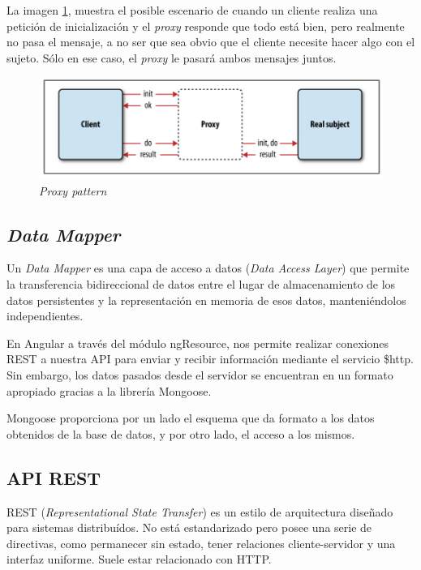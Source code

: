 La imagen \ref{fig:proxy}, muestra el posible escenario de cuando un cliente realiza una petición de inicialización y el \textit{proxy} responde que todo está bien, pero realmente no pasa el mensaje, a no ser que sea obvio que el cliente necesite hacer algo con el sujeto. Sólo en ese caso, el \textit{proxy} le pasará ambos mensajes juntos\cite{stoyanstefanov2010}.
 

\begin{figure}[htbp] 
    \centering
    \includegraphics[width=1\textwidth]{figuras/proxy_pattern.png}
    \caption{\textit{Proxy pattern}\cite{stoyanstefanov2010}}
    \label{fig:proxy}
\end{figure}	


\subsection{\textit{Data Mapper}}
Un \textit{Data Mapper} es una capa de acceso a datos (\textit{Data Access Layer}) que permite la transferencia bidireccional de datos entre el lugar de almacenamiento de los datos persistentes y la representación en memoria de esos datos, manteniéndolos independientes\cite{mgechev}.


En Angular a través del módulo ngResource, nos permite realizar conexiones REST a nuestra API para enviar y recibir información mediante el servicio \$http. Sin embargo, los datos pasados desde el servidor se encuentran en un formato apropiado gracias a la librería Mongoose.


Mongoose proporciona por un lado el esquema que da formato a los datos obtenidos de la base de datos, y por otro lado, el acceso a los mismos. 


\subsection{API REST}
REST (\textit{Representational State Transfer}) es un estilo de arquitectura diseñado para sistemas distribuídos. No está estandarizado pero posee una serie de directivas, como permanecer sin estado, tener relaciones cliente-servidor y una interfaz uniforme. Suele estar relacionado con HTTP.


